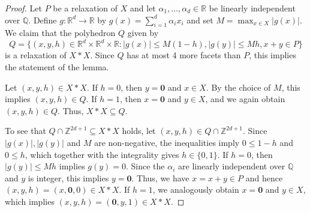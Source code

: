 \documentclass[10pt,a4paper]{amsart}
\newcommand{\Q}{\mathbb{Q}}
\newcommand{\R}{\mathbb{R}}
\newcommand{\Z}{\mathbb{Z}}
\newcommand{\zero}{\mathbf{0}}
\begin{document}
\begin{proof}
    Let $P$ be a relaxation of $X$ and let $\alpha_1, \dots, \alpha_d \in \R$ be linearly independent over $\Q$.
    Define $g : \R^d \to \R$ by $g(x) = \sum_{i=1}^d \alpha_i x_i$ and set $M = \max_{x \in X} |g(x)|$.
    We claim that the polyhedron $Q$ given by
    \[
        Q = \{(x,y,h) \in \R^d \times \R^d \times \R : |g(x)| \le M (1-h), |g(y)| \le M h, x + y \in P\}
    \]
    is a relaxation of $X \ast X$.
    Since $Q$ has at most 4 more facets than $P$, this implies the statement of the lemma.

    Let $(x,y,h) \in X \ast X$. If $h = 0$, then $y = \zero$ and $x \in X$.
    By the choice of $M$, this implies $(x,y,h) \in Q$. 
    If $h = 1$, then $x = \zero$ and $y \in X$, and we again obtain $(x,y,h) \in Q$.
    Thus, $X \ast X \subseteq Q$.

    To see that $Q \cap \Z^{2d+1} \subseteq X \ast X$ holds, let $(x,y,h) \in Q \cap \Z^{2d+1}$.
    Since $|g(x)|, |g(y)|$ and $M$ are non-negative, the inequalities imply $0 \le 1 - h$ and $0 \le h$, which together with the integrality gives $h \in \{0,1\}$. If $h = 0$, then $|g(y)| \le M h$ implies $g(y) = 0$.
    Since the $\alpha_i$ are linearly independent over $\Q$ and $y$ is integer, this implies $y = \zero$.
    Thus, we have $x = x + y \in P$ and hence $(x,y,h) = (x, \zero, 0) \in X \ast X$.
    If $h = 1$, we analogously obtain $x = \zero$ and $y \in X$, which implies $(x,y,h) = (\zero, y, 1) \in X \ast X$.
\end{proof}
\end{document}
